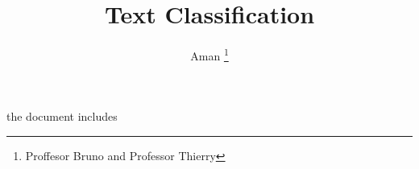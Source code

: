 \documentclass[12pt, letterpaper]{article}
\title {Text Classification}
\author {Aman  \thanks {Proffesor Bruno and Professor Thierry}}
\begin{document}
 
\begin{titlepage}
\maketitle
\end{titlepage}
 
the document includes 
\end{document}
